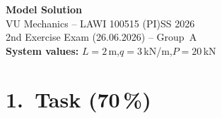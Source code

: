 \documentclass[a4paper,11pt]{article}
\begin{document}

\begin{center}
  {\Large\bfseries Model Solution}\\[4pt]
  {\large VU Mechanics -- LAWI 100515 (PI)\quad SS 2026}\\[2pt]
  {\normalsize 2nd Exercise Exam (26.06.2026) -- Group~A}\\[2pt]
  {\normalsize \textbf{System values:} $L = 2$\,m,\quad $q = 3$\,kN/m,\quad $P = 20$\,kN}
\end{center}

\section*{1.~Task \hfill (70\,\%)}
\end{document}
